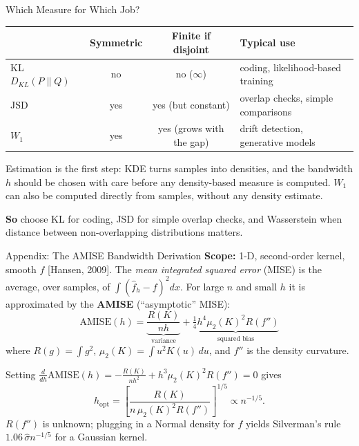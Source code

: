 \documentclass[10pt,aspectratio=169]{ntuabeamer}
\newcommand{\takeaway}[1]{\par\vspace{0.7em}\textcolor{ntuablue}{\textbf{So} #1}\par}
\begin{document}
	\begin{frame}{Which Measure for Which Job?}
		\small
		\begin{table}[]
			\centering
			\renewcommand{\arraystretch}{1.3}
			\begin{tabular}{l c c l}
				\toprule
				& \textbf{Symmetric} & \textbf{Finite if disjoint} & \textbf{Typical use} \\
				\midrule
				KL $D_{KL}(P\|Q)$ & no & no ($\infty$) & coding, likelihood-based training \\
				JSD & yes & yes (but constant) & overlap checks, simple comparisons \\
				$W_1$ & yes & yes (grows with the gap) & drift detection, generative models \\
				\bottomrule
			\end{tabular}
		\end{table}
		Estimation is the first step: KDE turns samples into densities, and the bandwidth $h$ should be chosen with care before any density-based measure is computed.
		$W_1$ can also be computed directly from samples, without any density estimate.

		\takeaway{choose KL for coding, JSD for simple overlap checks, and Wasserstein when distance between non-overlapping distributions matters.}
	\end{frame}

	\appendix

	\begin{frame}{Appendix: The AMISE Bandwidth Derivation}
		\small
		\textbf{Scope:} 1-D, second-order kernel, smooth $f$ [Hansen, 2009].
		The \emph{mean integrated squared error} (MISE) is the average, over samples, of $\int(\hat f_h-f)^2dx$.
		For large $n$ and small $h$ it is approximated by the \textbf{AMISE} (``asymptotic'' MISE):
		$$ \text{AMISE}(h) = \underbrace{\frac{R(K)}{nh}}_{\text{variance}} + \underbrace{\tfrac{1}{4} h^4 \mu_2(K)^2 R(f'')}_{\text{squared bias}} $$
		where $R(g)=\int g^2$, $\mu_2(K)=\int u^2K(u)\,du$, and $f''$ is the density curvature.

		\medskip
		Setting $\frac{d}{dh}\text{AMISE}(h) = -\frac{R(K)}{nh^2} + h^3 \mu_2(K)^2 R(f'') = 0$ gives
		$$ h_{\mathrm{opt}} = \left[ \frac{R(K)}{n\,\mu_2(K)^2 R(f'')} \right]^{1/5} \propto n^{-1/5}. $$
		$R(f'')$ is unknown; plugging in a Normal density for $f$ yields Silverman's rule $1.06\,\hat\sigma n^{-1/5}$ for a Gaussian kernel.
	\end{frame}
\end{document}
